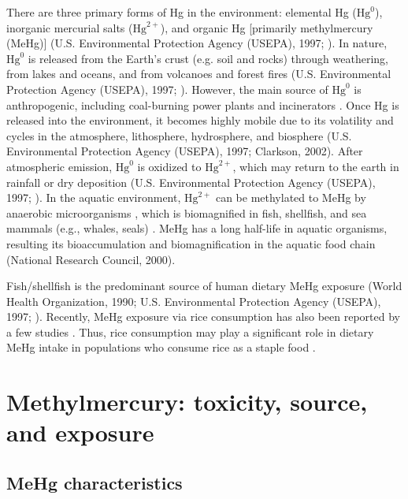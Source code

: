 There are three primary forms of Hg in the environment: elemental Hg (\(\text{Hg}^{0}\)), inorganic mercurial salts (\(\text{Hg}^{2+}\)), and organic Hg [primarily methylmercury (MeHg)] (U.S. Environmental Protection Agency (USEPA), 1997; \cite{clarkson2002three}). In nature, \(\text{Hg}^{0}\) is released from the Earth's crust (e.g. soil and rocks) through weathering, from lakes and oceans, and from volcanoes and forest fires (U.S. Environmental Protection Agency (USEPA), 1997; \cite{clarkson2002three}). However, the main source of \(\text{Hg}^{0}\) is anthropogenic, including coal-burning power plants and incinerators \cite{mason1994biogeochemical}. Once Hg is released into the environment, it becomes highly mobile due to its volatility and cycles in the atmosphere, lithosphere, hydrosphere, and biosphere (U.S. Environmental Protection Agency (USEPA), 1997; Clarkson, 2002). After atmospheric emission, \(\text{Hg}^0\) is oxidized to \(\text{Hg}^{2+}\), which may return to the earth in rainfall or dry deposition (U.S. Environmental Protection Agency (USEPA), 1997; \cite{clarkson2002three}). In the aquatic environment, \(\text{Hg}^{2+}\) can be methylated to MeHg by anaerobic microorganisms \cite{parks2013genetic}, which is biomagnified in fish, shellfish, and sea mammals (e.g., whales, seals) \cite{morel1998chemical}. MeHg has a long half-life in aquatic organisms, resulting its bioaccumulation and biomagnification in the aquatic food chain (National Research Council, 2000). 

Fish/shellfish is the predominant source of human dietary MeHg exposure (World Health Organization, 1990; U.S. Environmental Protection Agency (USEPA), 1997; \cite{clarkson2006toxicology}). Recently, MeHg exposure via rice consumption has also been reported by a few studies \citep{feng2007human,rothenberg2011low,li2012rice,davis2014dietary}. Thus, rice consumption may play a significant role in dietary MeHg intake in populations who consume rice as a staple food \citep{rothenberg2011low,rothenberg2013prenatal,rothenberg2014rice}.

\section{Methylmercury: toxicity, source, and exposure}

\subsection{MeHg characteristics}

